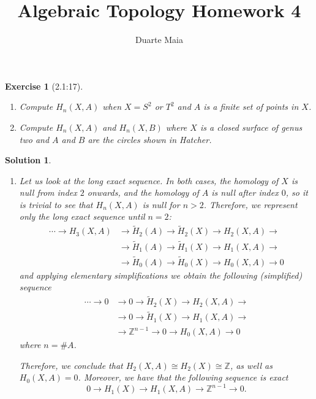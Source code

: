 \documentclass{article}
\title{Algebraic Topology Homework 4}
\author{Duarte Maia}
\theoremstyle{plain}
\newtheorem*{ex}{Exercise}
\theoremstyle{nonumberplain}
\newtheorem{sol}{Solution}
\newcommand{\Z}{\mathbb{Z}}
\begin{document}
\maketitle

\begin{ex}[2.1:17]
\leavevmode
\begin{enumerate}
\item Compute $H_n(X,A)$ when $X = S^2$ or $T^2$ and $A$ is a finite set of points in $X$.
\item Compute $H_n(X,A)$ and $H_n(X,B)$ where $X$ is a closed surface of genus two and $A$ and $B$ are the circles shown in Hatcher.
\end{enumerate}
\end{ex}

\begin{sol}
\leavevmode
\begin{enumerate}
\item Let us look at the long exact sequence. In both cases, the homology of $X$ is null from index $2$ onwards, and the homology of $A$ is null after index $0$, so it is trivial to see that $H_n(X,A)$ is null for $n > 2$. Therefore, we represent only the long exact sequence until $n = 2$:
\begin{equation}
\begin{aligned}
\cdots \to H_3(X,A) &\to \tilde H_2(A) \to \tilde H_2(X) \to H_2(X,A) \to\\
&\to \tilde H_1(A) \to \tilde H_1(X) \to H_1(X,A) \to\\
&\to \tilde H_0(A) \to \tilde H_0(X) \to H_0(X,A) \to 0
\end{aligned}
\end{equation}
and applying elementary simplifications we obtain the following (simplified) sequence
\begin{equation}
\begin{aligned}
\cdots \to 0 &\to 0 \to \tilde H_2(X) \to H_2(X,A) \to\\
&\to 0 \to \tilde H_1(X) \to H_1(X,A) \to\\
&\to \Z^{n-1} \to 0 \to H_0(X,A) \to 0
\end{aligned}
\end{equation}
where $n = \# A$.

Therefore, we conclude that $H_2(X,A) \cong H_2(X) \cong \Z$, as well as $H_0(X,A) = 0$. Moreover, we have that the following sequence is exact
\begin{equation}
0 \to H_1(X) \to H_1(X,A) \to \Z^{n-1} \to 0.
\end{equation}


\end{enumerate}
\end{sol}
\end{document}
